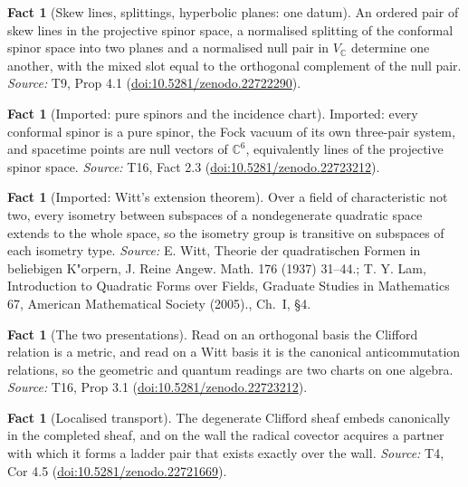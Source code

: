 \documentclass[11pt]{article}
\theoremstyle{definition}
\newtheorem{fact}[theorem]{Fact}
\theoremstyle{plain}
\providecommand{\C}{}\renewcommand{\C}{\mathbb{C}}
\begin{document}
\begin{fact}[Skew lines, splittings, hyperbolic planes: one datum]\label{c:correspondence.skew-lines-splittings-hyperbolic-planes-one}
An ordered pair of skew lines in the projective spinor space, a normalised splitting of the conformal spinor space into two planes and a normalised null pair in $V_\C$ determine one another, with the mixed slot equal to the orthogonal complement of the null pair.
\emph{Source:} T9, Prop 4.1 (\href{https://doi.org/10.5281/zenodo.22722290}{doi:10.5281/zenodo.22722290}).
\end{fact}

\begin{fact}[Imported: pure spinors and the incidence chart]\label{c:one-relation.imported-pure-spinors-incidence-chart}
Imported: every conformal spinor is a pure spinor, the Fock vacuum of its own three-pair system, and spacetime points are null vectors of $\C^6$, equivalently lines of the projective spinor space.
\emph{Source:} T16, Fact 2.3 (\href{https://doi.org/10.5281/zenodo.22723212}{doi:10.5281/zenodo.22723212}).
\end{fact}

\begin{fact}[Imported: Witt's extension theorem]\label{c:one-relation.imported-witts-extension-theorem}
Over a field of characteristic not two, every isometry between subspaces of a nondegenerate quadratic space extends to the whole space, so the isometry group is transitive on subspaces of each isometry type.
\emph{Source:} E. Witt, Theorie der quadratischen Formen in beliebigen K"orpern, J. Reine Angew. Math. 176 (1937) 31--44.; T. Y. Lam, Introduction to Quadratic Forms over Fields, Graduate Studies in Mathematics 67, American Mathematical Society (2005)., Ch.~I, \S4.
\end{fact}

\begin{fact}[The two presentations]\label{c:one-relation.two-presentations}
Read on an orthogonal basis the Clifford relation is a metric, and read on a Witt basis it is the canonical anticommutation relations, so the geometric and quantum readings are two charts on one algebra.
\emph{Source:} T16, Prop 3.1 (\href{https://doi.org/10.5281/zenodo.22723212}{doi:10.5281/zenodo.22723212}).
\end{fact}

\begin{fact}[Localised transport]\label{c:sheaf.localised-transport}
The degenerate Clifford sheaf embeds canonically in the completed sheaf, and on the wall the radical covector acquires a partner with which it forms a ladder pair that exists exactly over the wall.
\emph{Source:} T4, Cor 4.5 (\href{https://doi.org/10.5281/zenodo.22721669}{doi:10.5281/zenodo.22721669}).
\end{fact}
\end{document}
